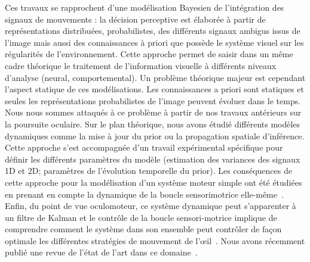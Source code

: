 \documentclass[11pt,french,a4paper,oneside]{article}%
\begin{document}
Ces travaux se rapprochent d'une modélisation Bayesien de l'intégration des signaux de mouvements : la décision perceptive est élaborée à partir de représentations distribuées, probabilistes, des différents signaux ambigus issus de l'image mais aussi des connaissances à priori que possède le système visuel sur les régularités de l'environnement. Cette approche permet de saisir dans un même cadre théorique le traitement de l'information visuelle à différents niveaux d'analyse (neural, comportemental). Un problème théorique majeur est cependant l'aspect statique de ces modélisations. Les connaissances a priori sont statiques et seules les représentations probabilistes de l'image peuvent évoluer dans le temps. Nous nous sommes attaqués à ce problème à partir de nos travaux antérieurs sur la poursuite oculaire. Sur le plan théorique, nous avons étudié différents modèles dynamiques comme la mise à jour du prior ou la propagation spatiale d'inférence. Cette approche s'est accompagnée d'un travail expérimental spécifique pour définir les différents paramètres du modèle (estimation des variances des signaux 1D et 2D; paramètres de l'évolution temporelle du prior). Les conséquences de cette approche pour la modélisation d'un système moteur simple ont été étudiées en prenant en compte la dynamique de la boucle sensorimotrice elle-même~\citep{Montagnini06neurocomp,Montagnini07a,Montagnini07,Montagnini07b}. Enfin, du point de vue oculomoteur, ce système dynamique peut s'apparenter à un filtre de Kalman et le contrôle de la boucle sensori-motrice implique de comprendre comment le système dans son ensemble peut contrôler de façon optimale les différentes stratégies de mouvement de l'\oe il~\citep{Bogadhi11,Fleuriet11}. %
Nous avons récemment publié une revue de l'état de l'art dans ce domaine~\citep{Montagnini15bicv}.
\end{document}
